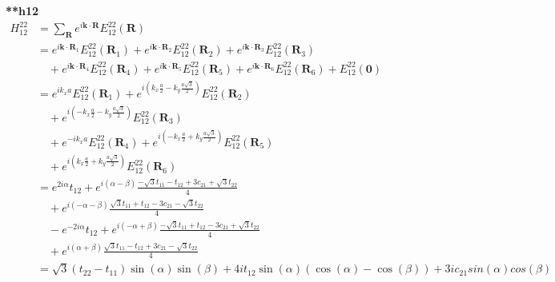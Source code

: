\documentclass[10Pt]{article}
\begin{document}
	\textbf{**h12}
\begin{align*}
	H^{22}_{12} &= \sum_{\mathbf{R}} e^{i \mathbf{k} \cdot \mathbf{R}} E^{22}_{12}(\mathbf{R}) \\
	&= e^{i \mathbf{k} \cdot \mathbf{R}_1} E^{22}_{12}(\mathbf{R}_1)
	+ e^{i \mathbf{k} \cdot \mathbf{R}_2} E^{22}_{12}(\mathbf{R}_2)
	+ e^{i \mathbf{k} \cdot \mathbf{R}_3} E^{22}_{12}(\mathbf{R}_3) \\
	&\quad + e^{i \mathbf{k} \cdot \mathbf{R}_4} E^{22}_{12}(\mathbf{R}_4)
	+ e^{i \mathbf{k} \cdot \mathbf{R}_5} E^{22}_{12}(\mathbf{R}_5)
	+ e^{i \mathbf{k} \cdot \mathbf{R}_6} E^{22}_{12}(\mathbf{R}_6)
	+ E^{22}_{12}(\mathbf{0}) \\
	&= e^{i k_x a} E^{22}_{12}(\mathbf{R}_1)
	+ e^{i \left( k_x \frac{a}{2} - k_y \frac{a\sqrt{3}}{2} \right)} E^{22}_{12}(\mathbf{R}_2) \\
	&\quad + e^{i \left( -k_x \frac{a}{2} - k_y \frac{a\sqrt{3}}{2} \right)} E^{22}_{12}(\mathbf{R}_3) \\
	&\quad + e^{-i k_x a } E^{22}_{12}(\mathbf{R}_4) 
	+ e^{i \left( -k_x \frac{a}{2} + k_y \frac{a\sqrt{3}}{2} \right)} E^{22}_{12}(\mathbf{R}_5) \\
	&\quad + e^{i \left( k_x \frac{a}{2} + k_y \frac{a\sqrt{3}}{2} \right)} E^{22}_{12}(\mathbf{R}_6) \\
	&= e^{2i\alpha} t_{12} 
	+ e^{i \left( \alpha - \beta \right)} \frac{-\sqrt{3}t_{11} - t_{12} + 3c_{21} + \sqrt{3}t_{22}}{4} \\
	&\quad + e^{i \left( -\alpha - \beta \right)} \frac{\sqrt{3}t_{11} + t_{12} - 3c_{21} - \sqrt{3}t_{22}}{4} \\
	&\quad - e^{-2i\alpha} t_{12} 
	+ e^{i \left( -\alpha + \beta \right)} \frac{-\sqrt{3}t_{11} + t_{12} - 3c_{21} + \sqrt{3}t_{22}}{4} \\
	&\quad + e^{i \left( \alpha + \beta \right)} \frac{\sqrt{3}t_{11} - t_{12} + 3c_{21} - \sqrt{3}t_{22}}{4} \\
	&= \sqrt{3}(t_{22} - t_{11}) \sin(\alpha) \sin(\beta) 
	+ 4i t_{12} \sin(\alpha) (\cos(\alpha) - \cos(\beta)) + 3i c_{21} sin(\alpha)cos(\beta) 
\end{align*}
\end{document}
